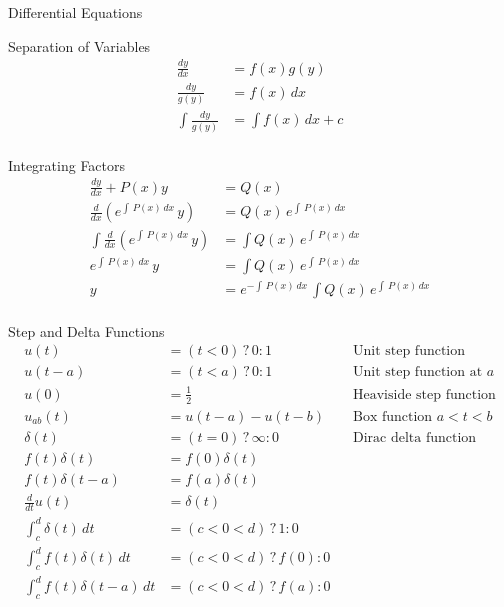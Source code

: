 %
%

\begin{section}{Differential Equations}
  \begin{subsection}{Separation of Variables}
    \begin{align*}
      \frac{dy}{dx} &= f(x)g(y) \\
      \frac{dy}{g(y)} &= f(x)\,dx \\
      \int{\frac{dy}{g(y)}} &= \int{f(x)}\,dx+c \\
    \end{align*}
  \end{subsection}
  \begin{subsection}{Integrating Factors}
    \begin{align*}
      \frac{dy}{dx} + P(x)y &= Q(x) \\
      \frac{d}{dx}(e^{\int\,P(x)\,dx}\,y) &= Q(x)\,e^{\int\,P(x)\,dx} \\
      \int{\frac{d}{dx}(e^{\int\,P(x)\,dx}\,y)} &= \int{Q(x)\,e^{\int\,P(x)\,dx}} \\
      e^{\int\,P(x)\,dx}\,y &= \int{Q(x)\,e^{\int\,P(x)\,dx}} \\
      y &= e^{-\int\,P(x)\,dx}\,\int{Q(x)\,e^{\int\,P(x)\,dx}} \\
    \end{align*}
  \end{subsection}
  \begin{subsection}{Step and Delta Functions}
    \begin{align*}
      u(t) &= (t<0) \,?\, 0 : 1 && \text{Unit step function}\\
      u(t-a) &= (t<a) \,?\, 0 : 1 && \text{Unit step function at $a$}\\
      u(0) &= \frac{1}{2} && \text{Heaviside step function}\\
      u_{ab}(t) &= u(t-a) - u(t-b) && \text{Box function $a<t<b$}\\
      \delta(t) &= (t=0)\,?\,\infty : 0 && \text{Dirac delta function}\\
      f(t)\delta(t) &= f(0)\delta(t) \\
      f(t)\delta(t-a) &= f(a)\delta(t) \\
      \frac{d}{dt}u(t) &= \delta(t)\\
      \int_c^d \delta(t)\,dt &= (c<0<d)\,?\,1:0 \\
      \int_c^d f(t)\delta(t)\,dt &= (c<0<d)\,?\,f(0):0 \\
      \int_c^d f(t)\delta(t-a)\,dt &= (c<0<d)\,?\,f(a):0 \\
    \end{align*}
  \end{subsection}
\end{section}
